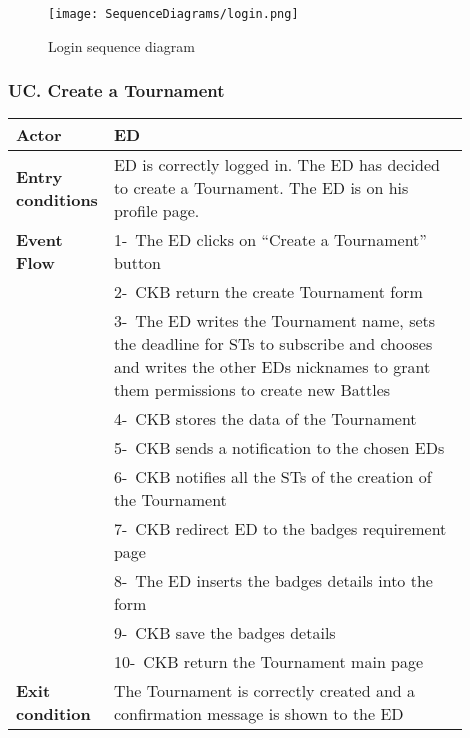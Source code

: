 \begin{figure}[H]
    \begin{center}
        \texttt{[image: SequenceDiagrams/login.png]}
        \caption{Login sequence diagram}
        \label{fig:login_seqd}%
    \end{center}
\end{figure}

\subsubsection*{UC\cuc . Create a Tournament}
\begin{center}
    \begin{longtable}{|l|p{0.9\linewidth}|}
        \hline
        \textbf{Actor}            & ED                                                                                                                                                                                       \\
        \hline
        \textbf{Entry conditions} & ED is correctly logged in. The ED has decided to create a Tournament. The ED is on his profile page.        \\
        \hline
        \textbf{Event Flow}       & 1-\ The ED clicks on “Create a Tournament” button        \\
        & 2-\ CKB return the create Tournament form        \\
        & 3-\ The ED writes the Tournament name, sets the deadline for STs to subscribe and chooses and writes the other EDs nicknames to grant them permissions to create new Battles        \\
        & 4-\ CKB stores the data of the Tournament        \\
        & 5-\ CKB sends a notification to the chosen EDs        \\
        & 6-\ CKB notifies all the STs of the creation of the Tournament        \\
        & 7-\ CKB redirect ED to the badges requirement page \\
        & 8-\ The ED inserts the badges details into the form \\
        & 9-\ CKB save the badges details \\
        & 10-\ CKB return the Tournament main page        \\
        \hline
        \textbf{Exit condition}   & The Tournament is correctly created and a confirmation message is shown to the ED        \\

\end{longtable}
\end{center}
